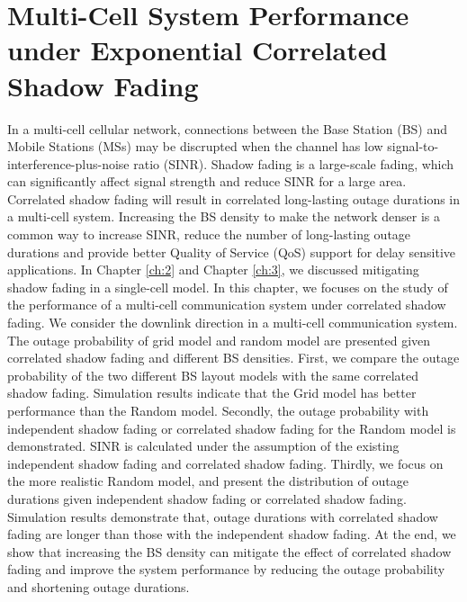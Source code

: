 \chapter{Multi-Cell System Performance under Exponential Correlated Shadow Fading}\label{ch:4}
 \par In a multi-cell cellular network, connections between the Base Station (BS) and Mobile Stations (MSs) may be discrupted when the channel has low signal-to-interference-plus-noise ratio (SINR). Shadow fading is a large-scale fading, which can significantly affect signal strength and reduce SINR for a large area.  Correlated shadow fading will result in correlated long-lasting outage durations in a multi-cell system.  Increasing the BS density to make the network denser is a common way to increase SINR, reduce the number of long-lasting outage durations and provide better Quality of Service (QoS) support for delay sensitive applications. In Chapter \ref{ch:2} and Chapter \ref{ch:3}, we discussed mitigating shadow fading in a single-cell model. In this chapter, we focuses on the study of the performance of a multi-cell communication system under correlated shadow fading. We consider the downlink direction in a multi-cell communication system. The outage probability of grid model and random model are presented given correlated shadow fading and different BS densities. First, we compare the outage probability of the two different BS layout models with the same correlated shadow fading. Simulation results indicate that the Grid model  has better performance than the Random model. Secondly, the outage probability with independent shadow fading or correlated shadow fading for the Random model is demonstrated. SINR is calculated under the assumption of the existing independent shadow fading and correlated shadow fading. Thirdly, we focus on the more realistic Random model, and present the distribution of outage durations given independent shadow fading or correlated shadow fading. Simulation results demonstrate that, outage durations with correlated shadow fading are longer than those with the independent shadow fading. At the end, we show that increasing the BS density can mitigate the effect of correlated shadow fading and improve the system performance by reducing the outage probability and shortening outage durations. 
 
